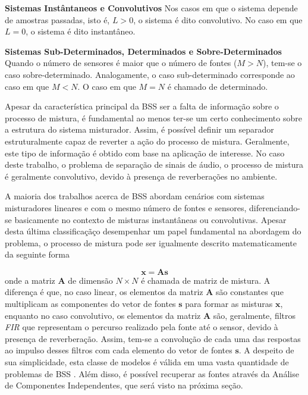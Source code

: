      \textbf{Sistemas Instântaneos e Convolutivos} Nos casos em que o sistema depende de amostras passadas, isto é, $L>0$, o sistema é dito convolutivo. No caso em que $L=0$, o sistema é dito instantâneo.
    
     \textbf{Sistemas Sub-Determinados, Determinados e Sobre-Determinados} Quando o número de sensores é maior que o número de fontes ($M>N$), tem-se o caso sobre-determinado. Analogamente, o caso sub-determinado corresponde ao caso em que $M<N$. O caso em que $M=N$ é chamado de determinado.
     
     Apesar da característica principal da BSS ser a falta de informação sobre o processo de mistura, é fundamental ao menos ter-se um certo conhecimento sobre a estrutura do sistema misturador. Assim, é possível definir um separador estruturalmente capaz de reverter a ação do processo de mistura. Geralmente, este tipo de informação é obtido com base na aplicação de interesse. No caso deste trabalho, o problema de separação de sinais de áudio, o processo de mistura é geralmente convolutivo, devido à presença de reverberações no ambiente.
     
     A maioria dos trabalhos acerca de BSS abordam cenários com sistemas misturadores lineares e com o mesmo número de fontes e sensores, diferenciando-se basicamente no contexto de misturas instantâneas ou convolutivas. Apesar desta última classificaçãço desempenhar um papel fundamental na abordagem do problema, o  processo de mistura pode ser igualmente descrito matematicamente da seguinte forma
     
     \begin{equation}\label{eq:xn}
        \mathbf{x} = \mathbf{A}\mathbf{s}
    \end{equation}
    onde a matriz $\mathbf{A}$ de dimensão ${N \times N}$ é chamada de matriz de mistura. A diferença é que, no caso linear, os elementos da matriz $\mathbf{A}$ são constantes que multiplicam as componentes do vetor de fontes $\mathbf{s}$ para formar as misturas $\mathbf{x}$, enquanto no caso convolutivo, os elementos da matriz $\mathbf{A}$ são, geralmente, filtros \textit{FIR} que representam o percurso realizado pela fonte até o sensor, devido à presença de reverberação. Assim, tem-se a convolução de cada uma das respostas ao impulso desses filtros com cada elemento do vetor de fontes $\mathbf{s}$. A despeito de sua simplicidade, esta classe de modelos é válida em uma vasta quantidade de problemas de BSS \cite{ICA}. Além disso, é possível recuperar as fontes através da Análise de Componentes Independentes, que será visto na próxima seção.

